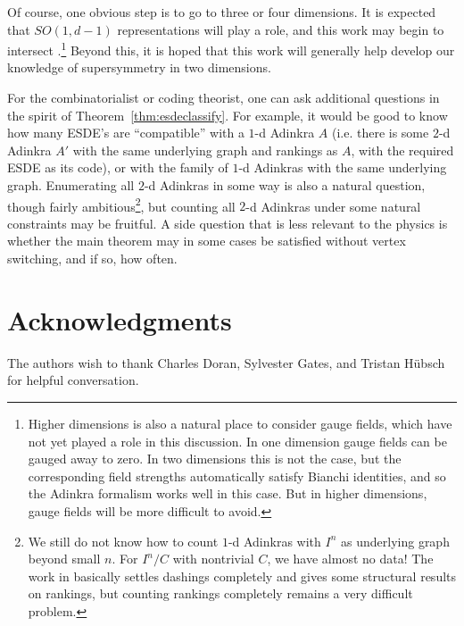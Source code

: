 \documentclass[12pt,twoside,singlespace]{article}
\numberwithin{equation}{section}
\theoremstyle{definition}
\begin{document}
Of course, one obvious step is to go to three or four dimensions.  It is expected that $SO(1,d-1)$ representations will play a role, and this work may begin to intersect \cite{faux:dimensional_enhancement,faux:spin_holography}.\footnote{Higher dimensions is also a natural place to consider gauge fields, which have not yet played a role in this discussion.  In one dimension gauge fields can be gauged away to zero.  In two dimensions this is not the case, but the corresponding field strengths automatically satisfy Bianchi identities, and so the Adinkra formalism works well in this case.  But in higher dimensions, gauge fields will be more difficult to avoid.} Beyond this, it is hoped that this work will generally help develop our knowledge of supersymmetry in two dimensions.

For the combinatorialist or coding theorist, one can ask additional questions in the spirit of Theorem~\ref{thm:esdeclassify}. For example, it would be good to know how many ESDE's are ``compatible'' with a $1$-d Adinkra $A$ (i.e. there is some $2$-d Adinkra $A'$ with the same underlying graph and rankings as $A$, with the required ESDE as its code), or with the family of $1$-d Adinkras with the same underlying graph. Enumerating all $2$-d Adinkras in some way is also a natural question, though fairly ambitious\footnote{We still do not know how to count $1$-d Adinkras with $I^n$ as underlying graph beyond small $n$. For $I^n/C$ with nontrivial $C$, we have almost no data! The work in \cite{zhang:adinkras} basically settles dashings completely and gives some structural results on rankings, but counting rankings completely remains a very difficult problem.}, but counting all $2$-d Adinkras under some natural constraints may be fruitful.  A side question that is less relevant to the physics is whether the main theorem may in some cases be satisfied without vertex switching, and if so, how often.

\section*{Acknowledgments}
The authors wish to thank Charles Doran, Sylvester Gates, and Tristan H\"ubsch for helpful conversation.

\appendix
\end{document}
